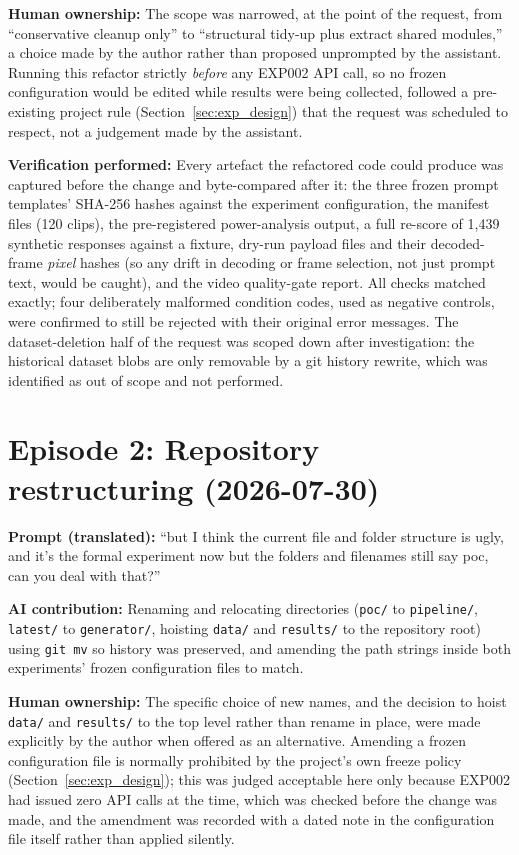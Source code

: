 \textbf{Human ownership:} The scope was narrowed, at the point of the request, from ``conservative cleanup only'' to ``structural tidy-up plus extract shared modules,'' a choice made by the author rather than proposed unprompted by the assistant. Running this refactor strictly \emph{before} any EXP002 API call, so no frozen configuration would be edited while results were being collected, followed a pre-existing project rule (Section~\ref{sec:exp_design}) that the request was scheduled to respect, not a judgement made by the assistant.

\textbf{Verification performed:} Every artefact the refactored code could produce was captured before the change and byte-compared after it: the three frozen prompt templates' SHA-256 hashes against the experiment configuration, the manifest files (120 clips), the pre-registered power-analysis output, a full re-score of 1{,}439 synthetic responses against a fixture, dry-run payload files and their decoded-frame \emph{pixel} hashes (so any drift in decoding or frame selection, not just prompt text, would be caught), and the video quality-gate report. All checks matched exactly; four deliberately malformed condition codes, used as negative controls, were confirmed to still be rejected with their original error messages. The dataset-deletion half of the request was scoped down after investigation: the historical dataset blobs are only removable by a git history rewrite, which was identified as out of scope and not performed.

\section{Episode 2: Repository restructuring (2026-07-30)}
\textbf{Prompt (translated):} ``but I think the current file and folder structure is ugly, and it's the formal experiment now but the folders and filenames still say poc, can you deal with that?''

\textbf{AI contribution:} Renaming and relocating directories (\texttt{poc/} to \texttt{pipeline/}, \texttt{latest/} to \texttt{generator/}, hoisting \texttt{data/} and \texttt{results/} to the repository root) using \texttt{git mv} so history was preserved, and amending the path strings inside both experiments' frozen configuration files to match.

\textbf{Human ownership:} The specific choice of new names, and the decision to hoist \texttt{data/} and \texttt{results/} to the top level rather than rename in place, were made explicitly by the author when offered as an alternative. Amending a frozen configuration file is normally prohibited by the project's own freeze policy (Section~\ref{sec:exp_design}); this was judged acceptable here only because EXP002 had issued zero API calls at the time, which was checked before the change was made, and the amendment was recorded with a dated note in the configuration file itself rather than applied silently.

